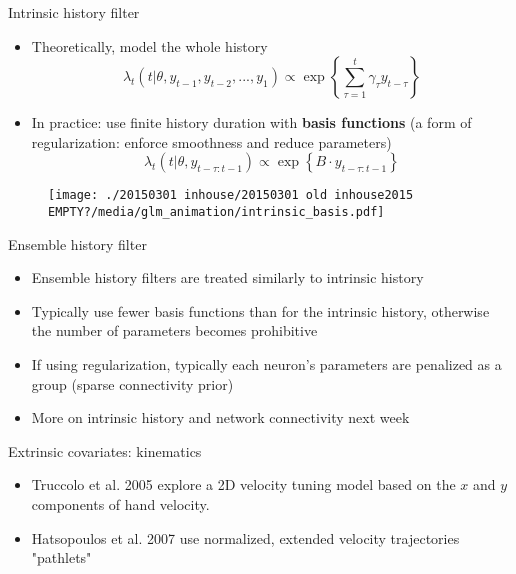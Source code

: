 \documentclass[svgnames,13pt,handout]{beamer}
\DeclareRobustCommand{\emph}[1]{\textbf{{\color{emphasizecolor} #1}}}
\begin{document}
\begin{frame}{Intrinsic history filter}
\begin{itemize}
	\item <1->Theoretically, model the whole history \[\lambda_t(t|\theta,y_{t-1},y_{t-2},...,y_1) \propto \exp\left\{ \sum_{\tau=1}^t \gamma_\tau y_{t-\tau} \right\}\]
	\item <2->In practice: use finite history duration with \emph{basis functions} (a form of regularization: enforce smoothness and reduce parameters) \[\lambda_t(t|\theta,y_{t-\tau:t-1}) \propto \exp\left\{ B \cdot y_{t-\tau:t-1} \right\}\]
	\end{itemize}
\begin{overprint}
	\begin{figure}\centering\texttt{[image: ./20150301 inhouse/20150301 old inhouse2015 EMPTY?/media/glm\_animation/intrinsic\_basis.pdf]}\\\end{figure}
\end{overprint}
\end{frame} 

\begin{frame}{Ensemble history filter}
\begin{itemize}
	\item <1->Ensemble history filters are treated similarly to intrinsic history
	\item <2->Typically use fewer basis functions than for the intrinsic history, otherwise the number of parameters becomes prohibitive
	\item <3->If using regularization, typically each neuron's parameters are penalized as a group (sparse connectivity prior)
	\item <4->More on intrinsic history and network connectivity next week
\end{itemize}
\end{frame} 

\begin{frame}{Extrinsic covariates: kinematics}
\begin{itemize}
	\item <1->Truccolo et al. 2005 explore a 2D velocity tuning model based on the $x$ and $y$ components of hand velocity. 
	\item <2->Hatsopoulos et al. 2007 use normalized, extended velocity trajectories "pathlets"
\end{itemize}
\end{frame} 
\end{document}
